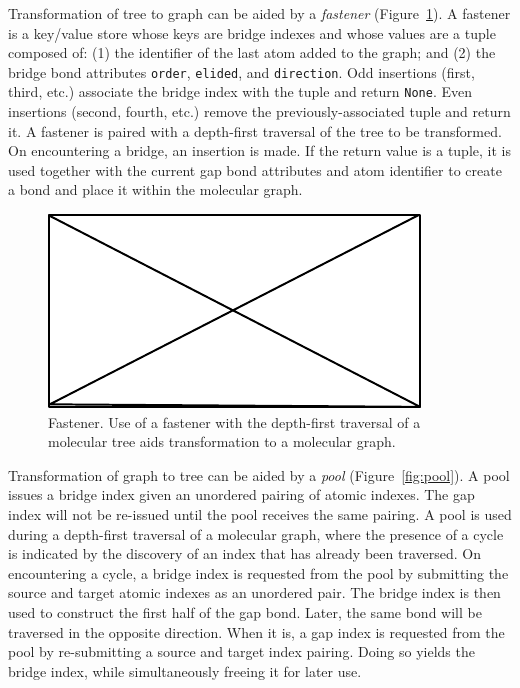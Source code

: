 \documentclass{article}
\def\ttt{\texttt}
\begin{document}
Transformation of tree to graph can be aided by a \textit{fastener} (Figure~\ref{fig:fastener}). A fastener is a key/value store whose keys are bridge indexes and whose values are a tuple composed of: (1) the identifier of the last atom added to the graph; and (2) the bridge bond attributes \ttt{order}, \ttt{elided}, and \ttt{direction}. Odd insertions (first, third, etc.) associate the bridge index with the tuple and return \ttt{None}. Even insertions (second, fourth, etc.) remove the previously-associated tuple and return it. A fastener is paired with a depth-first traversal of the tree to be transformed. On encountering a bridge, an insertion is made. If the return value is a tuple, it is used together with the current gap bond attributes and atom identifier to create a bond and place it within the molecular graph.

\begin{figure}
    \centering
    \includegraphics{filler}
    \caption{Fastener. Use of a fastener with the depth-first traversal of a molecular tree aids transformation to a molecular graph.}
    \label{fig:fastener}
\end{figure}

Transformation of graph to tree can be aided by a \textit{pool} (Figure~\ref{fig:pool}). A pool issues a bridge index given an unordered pairing of atomic indexes. The gap index will not be re-issued until the pool receives the same pairing. A pool is used during a depth-first traversal of a molecular graph, where the presence of a cycle is indicated by the discovery of an index that has already been traversed. On encountering a cycle, a bridge index is requested from the pool by submitting the source and target atomic indexes as an unordered pair. The bridge index is then used to construct the first half of the gap bond. Later, the same bond will be traversed in the opposite direction. When it is, a gap index is requested from the pool by re-submitting a source and target index pairing. Doing so yields the bridge index, while simultaneously freeing it for later use.
\end{document}
